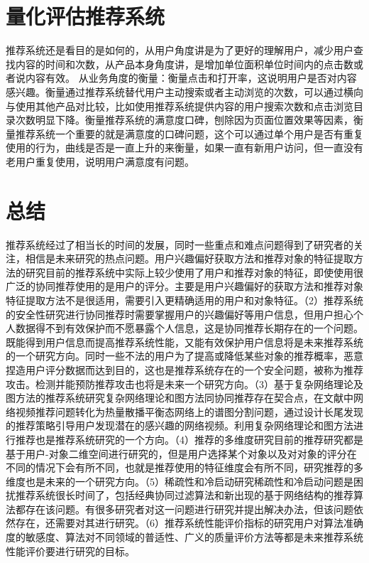   \section{量化评估推荐系统}
  推荐系统还是看目的是如何的，从用户角度讲是为了更好的理解用户，减少用户查找内容的时间和次数，从产品本身角度讲，是增加单位面积单位时间内的点击数或者说内容有效。 从业务角度的衡量：衡量点击和打开率，这说明用户是否对内容感兴趣。衡量通过推荐系统替代用户主动搜索或者主动浏览的次数，可以通过横向与使用其他产品对比较，比如使用推荐系统提供内容的用户搜索次数和点击浏览目录次数明显下降。衡量推荐系统的满意度口碑，刨除因为页面位置效果等因素，衡量推荐系统一个重要的就是满意度的口碑问题，这个可以通过单个用户是否有重复使用的行为，曲线是否是一直上升的来衡量，如果一直有新用户访问，但一直没有老用户重复使用，说明用户满意度有问题。
  \section{总结}
  推荐系统经过了相当长的时间的发展，同时一些重点和难点问题得到了研究者的关注，相信是未来研究的热点问题。用户兴趣偏好获取方法和推荐对象的特征提取方法的研究目前的推荐系统中实际上较少使用了用户和推荐对象的特征，即使使用很广泛的协同推荐使用的是用户的评分。主要是用户兴趣偏好的获取方法和推荐对象特征提取方法不是很适用，需要引入更精确适用的用户和对象特征。（2）推荐系统的安全性研究进行协同推荐时需要掌握用户的兴趣偏好等用户信息，但用户担心个人数据得不到有效保护而不愿暴露个人信息，这是协同推荐长期存在的一个问题。既能得到用户信息而提高推荐系统性能，又能有效保护用户信息将是未来推荐系统的一个研究方向。同时一些不法的用户为了提高或降低某些对象的推荐概率，恶意捏造用户评分数据而达到目的，这也是推荐系统存在的一个安全问题，被称为推荐攻击。检测并能预防推荐攻击也将是未来一个研究方向。（3）基于复杂网络理论及图方法的推荐系统研究复杂网络理论和图方法同协同推荐存在契合点，在文献中网络视频推荐问题转化为热量散播平衡态网络上的谱图分割问题，通过设计长尾发现的推荐策略引导用户发现潜在的感兴趣的网络视频。利用复杂网络理论和图方法进行推荐也是推荐系统研究的一个方向。（4）推荐的多维度研究目前的推荐研究都是基于用户-对象二维空间进行研究的，但是用户选择某个对象以及对对象的评分在不同的情况下会有所不同，也就是推荐使用的特征维度会有所不同，研究推荐的多维度也是未来的一个研究方向。（5）稀疏性和冷启动研究稀疏性和冷启动问题是困扰推荐系统很长时间了，包括经典协同过滤算法和新出现的基于网络结构的推荐算法都存在该问题。有很多研究者对这一问题进行研究并提出解决办法，但该问题依然存在，还需要对其进行研究。（6）推荐系统性能评价指标的研究用户对算法准确度的敏感度、算法对不同领域的普适性、广义的质量评价方法等都是未来推荐系统性能评价要进行研究的目标。